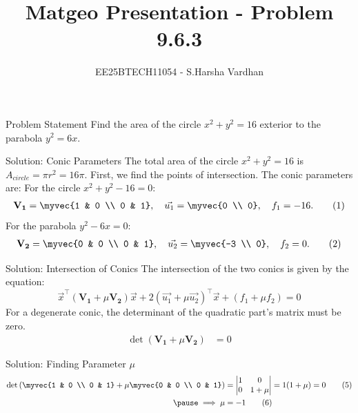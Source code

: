 \documentclass{beamer}
\title{Matgeo Presentation - Problem 9.6.3}
\author{EE25BTECH11054 - S.Harsha Vardhan}
\numberwithin{equation}{section}
\theoremstyle{remark}
\providecommand{\mtx}[1]{\mathbf{#1}}
\begin{document}
\begin{frame}
  \titlepage
\end{frame}

\begin{frame}{Problem Statement}
Find the area of the circle $x^2 + y^2 = 16$ exterior to the parabola $y^2 = 6x$.
\end{frame}

\begin{frame}{Solution: Conic Parameters}
The total area of the circle $x^2 + y^2 = 16$ is $A_{circle} = \pi r^2 = 16\pi$.
First, we find the points of intersection. The conic parameters are:
\pause
For the circle $x^2 + y^2 - 16 = 0$:
\begin{align}
\mtx{V_1} = \myvec{1 & 0 \\ 0 & 1}, \quad \vec{u_1} = \myvec{0 \\ 0}, \quad f_1 = -16. \tag{1}
\end{align}
\pause
For the parabola $y^2 - 6x = 0$:
\begin{align}
\mtx{V_2} = \myvec{0 & 0 \\ 0 & 1}, \quad \vec{u_2} = \myvec{-3 \\ 0}, \quad f_2 = 0. \tag{2}
\end{align}
\end{frame}

\begin{frame}{Solution: Intersection of Conics}
The intersection of the two conics is given by the equation:
\begin{equation}
	\vec{x}^\top(\mtx{V_1} + \mu\mtx{V_2})\vec{x} + 2(\vec{u_1} + \mu\vec{u_2})^\top\vec{x} + (f_1 + \mu f_2) = 0 \tag{3}
\end{equation}
\pause
For a degenerate conic, the determinant of the quadratic part's matrix must be zero.
\begin{align}
\det(\mtx{V_1} + \mu\mtx{V_2}) &= 0 \tag{4}
\end{align}
\end{frame}

\begin{frame}{Solution: Finding Parameter $\mu$}
\begin{align}
\det\left(\myvec{1 & 0 \\ 0 & 1} + \mu\myvec{0 & 0 \\ 0 & 1}\right) &=
\begin{vmatrix}
	1 & 0 \\
	0 & 1+\mu
\end{vmatrix}
 = 1(1+\mu) = 0 \tag{5} \\
 \pause
\implies \mu &= -1 \tag{6}
\end{align}
\end{frame}
\end{document}
